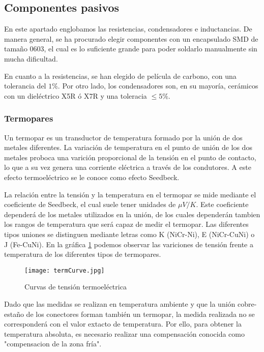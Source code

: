 	\subsection{Componentes pasivos}
	
	En este apartado englobamos las resistencias, condensadores e inductancias. De manera general, se ha procurado elegir componentes con un encapsulado SMD de tamaño 0603, el cual es lo suficiente grande para poder soldarlo manualmente sin mucha dificultad.
	
	En cuanto a la resistencias, se han elegido de película de carbono, con una tolerancia del $1 \% $. Por otro lado, los condensadores son, en su mayoría, cerámicos con un dieléctrico X5R ó X7R y una toleracia $\leq 5 \%$. 
	
	\subsubsection{Termopares}
	
	Un termopar es un transductor de temperatura formado por la unión de dos metales diferentes. La variación de temperatura en el punto de unión de los dos metales proboca una varición proporcional de la tensión en el punto de contacto, lo que a su vez genera una corriente eléctrica a través de los condutores. A este efecto termoeléctrico se le conoce como efecto Seedbeck. 
	
	La relación entre la tensión y la temperatura en el termopar se mide mediante el coeficiente de Seedbeck, el cual suele tener unidades de $\mu V / K$. Este coeficiente dependerá de los metales utilizados en la unión, de los cuales dependerán tambien los rangos de temperatura que será capaz de medir el termopar. Las diferentes tipos uniones se distinguen mediante letras como K (NiCr-Ni), E (NiCr-CuNi) o  J (Fe-CuNi). En la gráfica \ref{fig:termCurve} podemos observar las variciones de tensión frente a temperatura de los diferentes tipos de termopares.
	
	\begin{figure}[htb!]
		\centering
		\texttt{[image: termCurve.jpg]}
		\caption{Curvas de tensión termoeléctrica}
		\label{fig:termCurve}
	\end{figure}
	
	
	Dado que las medidas se realizan en temperatura ambiente y que la unión cobre-estaño de los conectores forman también un termopar, la medida realizada no se corresponderá con el valor extacto de temperatura. Por ello, para obtener la temperatura absoluta, es necesario realizar una  compensación conocida como "compensacion de la zona fría".
	
